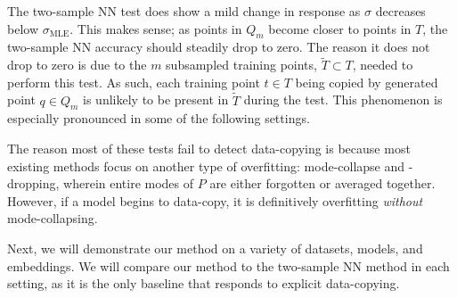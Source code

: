 The two-sample NN test does show a mild change in response as $\sigma$ decreases below $\sigma_{\text{MLE}}$. This makes sense; as points in $Q_m$ become closer to points in $T$, the two-sample NN accuracy should steadily drop to zero. The reason it does not drop to zero is due to the $m$ subsampled training points, $\widetilde{T} \subset T$, needed to perform this test. As such, each training point $t \in T$ being copied by generated point $q \in Q_m$ is unlikely to be present in $\widetilde{T}$ during the test. This phenomenon is especially pronounced in some of the following settings. 

The reason most of these tests fail to detect data-copying is because most existing methods focus on another type of overfitting: mode-collapse and -dropping, wherein entire modes of $P$ are either forgotten or averaged together. However, if a model begins to data-copy, it is definitively overfitting \emph{without} mode-collapsing. 

Next, we will demonstrate our method on a variety of datasets, models, and embeddings. We will compare our method to the two-sample NN method in each setting, as it is the only baseline that responds to explicit data-copying.

